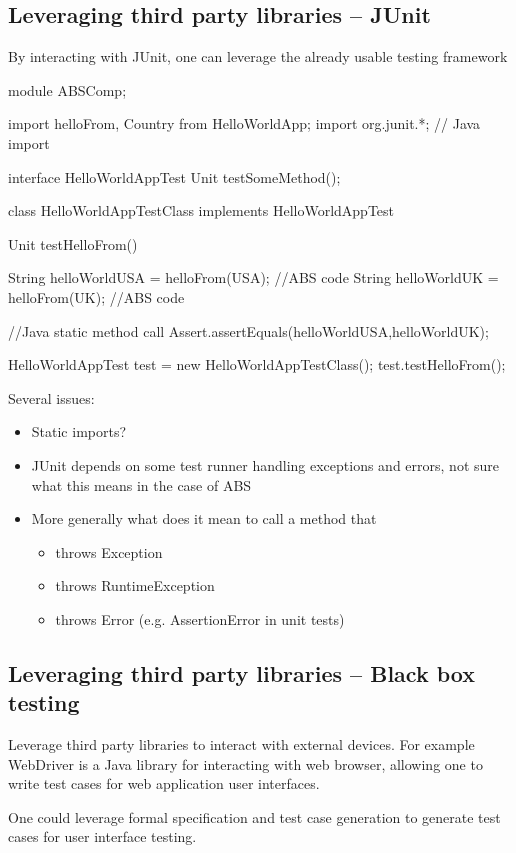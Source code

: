 \documentclass[a4paper,11pt,final]{article}
\begin{document}
\subsection{Leveraging third party libraries -- JUnit}
By interacting with JUnit, one can leverage the already usable testing framework
\begin{absexamplen}
module ABSComp;

import helloFrom, Country from HelloWorldApp;
import org.junit.*; // Java import

interface HelloWorldAppTest { Unit testSomeMethod(); }

class HelloWorldAppTestClass 
implements HelloWorldAppTest {
  Unit testHelloFrom() {
    String helloWorldUSA = helloFrom(USA); //ABS code 
    String helloWorldUK = helloFrom(UK); //ABS code
    
    //Java static method call
    Assert.assertEquals(helloWorldUSA,helloWorldUK); 
  }
}
{
  HelloWorldAppTest test = new HelloWorldAppTestClass();
  test.testHelloFrom();
}
\end{absexamplen}
Several issues:
\begin{itemize}
  \item Static imports?
  \item JUnit depends on some test runner handling exceptions and errors, not
  sure what this means in the case of ABS
  \item More generally what does it mean to call a method that 
  \begin{itemize}
    \item throws Exception
    \item throws RuntimeException
    \item throws Error (e.g. AssertionError in unit tests)
  \end{itemize}
\end{itemize}
  
\subsection{Leveraging third party libraries -- Black box testing}
Leverage third party libraries to interact with external devices. For example
WebDriver is a Java library for interacting with web browser, allowing one to
write test cases for web application user interfaces.

One could leverage formal specification and test case generation to generate
test cases for user interface testing.
\end{document}
